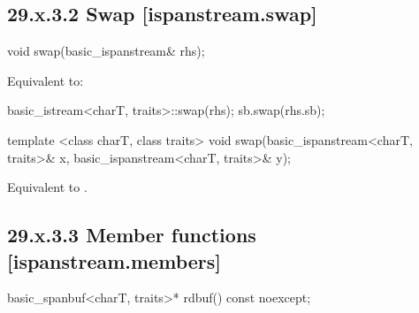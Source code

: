 \documentclass[ebook,11pt,article]{memoir}
\begin{document}
\subsection{29.x.3.2 Swap [ispanstream.swap]}
\label{ispanstream.assign}

%

\begin{itemdecl}
void swap(basic_ispanstream& rhs);
\end{itemdecl}

\begin{itemdescr}
\pnum
\effects Equivalent to:
\begin{codeblock}
    basic_istream<charT, traits>::swap(rhs);
    sb.swap(rhs.sb);
\end{codeblock}
\end{itemdescr}


\begin{itemdecl}
template <class charT, class traits>
  void swap(basic_ispanstream<charT, traits>& x,
            basic_ispanstream<charT, traits>& y);
\end{itemdecl}

\begin{itemdescr}
\pnum
\effects Equivalent to 
.
\end{itemdescr}

\subsection{29.x.3.3 Member functions [ispanstream.members]}
\label{ispanstream.members}

\begin{itemdecl}
basic_spanbuf<charT, traits>* rdbuf() const noexcept;
\end{itemdecl}
\end{document}
